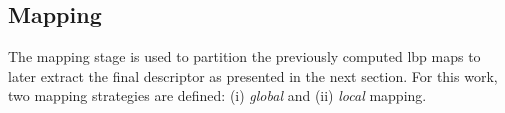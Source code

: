 \begin{table}
\caption{Number of patterns ($LBP_{\#pat}$) for different sampling points and radius ($\{P,R\}$) of the \ac{lbp} descriptor.}
\label{tab:lbphist}
\end{table}

\subsection{Mapping} \label{subsec:mapping}
The mapping stage is used to partition the previously computed \ac{lbp} maps to later extract the final descriptor as presented in the next section.
For this work, two mapping strategies are defined: (i) \emph{global} and (ii) \emph{local} mapping.


